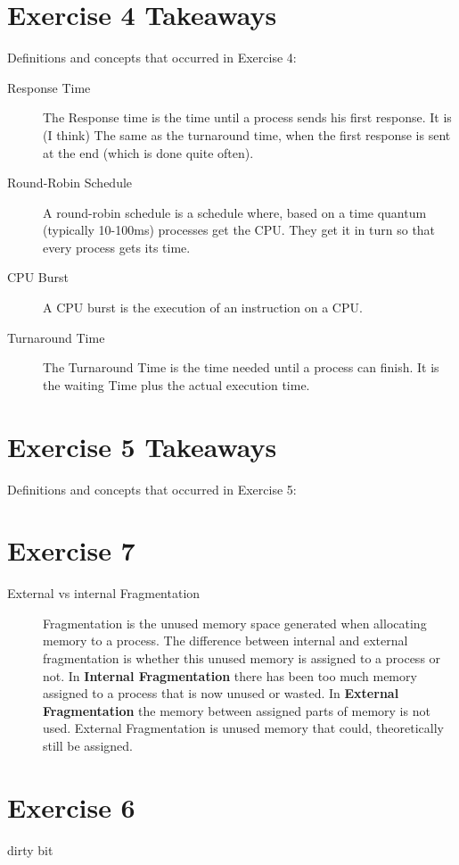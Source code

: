 \documentclass{article}
\begin{document}
	\section*{Exercise 4 Takeaways}
   Definitions and concepts that occurred in Exercise 4:
	\begin{description}
		\item[Response Time] The Response time is the time until a process sends his first response. It is (I think) The same as the turnaround time, when the first response is sent at the end (which is done quite often).
		
		\item[Round-Robin Schedule] A round-robin schedule is a schedule where, based on a time quantum (typically 10-100ms) processes get the CPU. They get it in turn so that every process gets its time. 
		\item[CPU Burst] A CPU burst is the execution of an instruction on a CPU. 
		
		\item[Turnaround Time] The Turnaround Time is the time needed until a process can finish. It is the waiting Time plus the actual execution time. 
	\end{description}
	
	\section*{Exercise 5 Takeaways}
   Definitions and concepts that occurred in Exercise 5:	
   
   \section{Exercise 7}
   \begin{description}
   	\item[External vs internal Fragmentation] Fragmentation is the unused memory space generated when allocating memory to a process. The difference between internal and external fragmentation is whether this unused memory is assigned to a process or not. In \textbf{Internal Fragmentation} there has been too much memory assigned to a process that is now unused or wasted. In \textbf{External Fragmentation} the memory between assigned parts of memory is not used. External Fragmentation is unused memory that could, theoretically still be assigned. 
   
   \end{description}
	\section*{Exercise 6}
	\begin{description}
		\item[dirty bit]
	\end{description}
\end{document}
